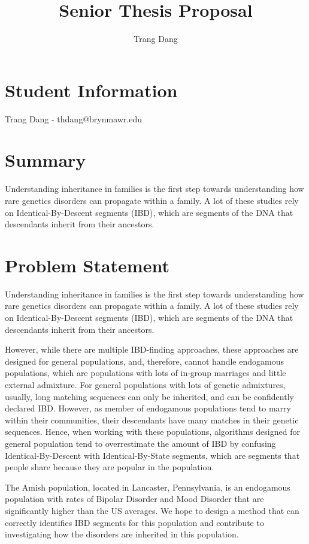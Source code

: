 \documentclass[12pt]{article}
\title{Senior Thesis Proposal}
\author{Trang Dang}
\makeatletter
\let\inserttitle\@title
\let\insertauthor\@author
\makeatother
\begin{document}
\begin{center}
  \LARGE{\inserttitle}

  \Large{\insertauthor}
\end{center}

\section{Student Information}

Trang Dang - thdang@brynmawr.edu

\section{Summary}



Understanding inheritance in families is the first step towards understanding how rare genetics disorders can propagate within a family. A lot of these studies rely on Identical-By-Descent segments (IBD), which are segments of the DNA that descendants inherit from their ancestors. 

\section{Problem Statement}

Understanding inheritance in families is the first step towards understanding how rare genetics disorders can propagate within a family. A lot of these studies rely on Identical-By-Descent segments (IBD), which are segments of the DNA that descendants inherit from their ancestors. 

However, while there are multiple IBD-finding approaches, these approaches are designed for general populations, and, therefore, cannot handle endogamous populations, which are populations with lots of in-group marriages and little external admixture. 
For general populations with lots of genetic admixtures, usually, long matching sequences can only be inherited, and can be confidently declared IBD. 
However, as member of endogamous populations tend to marry within their communities, their descendants have many matches in their genetic sequences. 
Hence, when working with these populations, algorithms designed for general population tend to overrestimate the amount of IBD by confusing Identical-By-Descent with Identical-By-State segments, which are segments that people share because they are popular in the population. 

The Amish population, located in Lancaster, Pennsylvania, is an endogamous population with rates of Bipolar Disorder and Mood Disorder that are significantly higher than the US averages. We hope to design a method that can correctly identifies IBD segments for this population and contribute to investigating how the disorders are inherited in this population.
\end{document}
